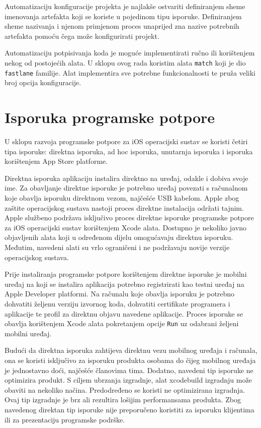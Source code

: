 \documentclass[times, utf8, diplomski, numeric]{fer}
\begin{document}
Automatizaciju konfiguracije projekta je najlakše ostvariti definiranjem sheme imenovanja artefakta koji se koriste u pojedinom tipu isporuke. Definiranjem sheme nazivanja i njenom primjenom proces unaprijed zna nazive potrebnih artefakta pomoću čega može konfigurirati projekt.

Automatizaciju potpisivanja koda je moguće implementirati ručno ili korištenjem nekog od postojećih alata. U sklopu ovog rada koristim alata \verb|match| koji je dio \verb|fastlane| familije. Alat implementira sve potrebne funkcionalnosti te pruža veliki broj opcija konfiguracije.

\section{Isporuka programske potpore} \label{header:RucnaIsporuka}

U sklopu razvoja programske potpore za iOS operacijski sustav se koristi četiri tipa isporuke: direktna isporuka, ad hoc isporuka, unutarnja isporuka i isporuka korištenjem App Store platforme.

Direktna isporuka aplikaciju instalira direktno na uređaj, odakle i dobiva svoje ime. Za obavljanje direktne isporuke je potrebno uređaj povezati s računalnom koje obavlja isporuku direktnom vezom, najčešće USB kabelom. Apple zbog zaštite operacijskog sustava nastoji proces direktne instalacija održati tajnim. Apple službeno podržava isključivo proces direktne isporuke programske potpore za iOS operacijski sustav korištenjem Xcode alata. Dostupno je nekoliko javno objavljenih alata koji u određenom dijelu omogućavaju direktnu isporuku. Međutim, navedeni alati su vrlo ograničeni i ne podržavaju novije verzije operacijskog sustava.

Prije instaliranja programske potpore korištenjem direktne isporuke je mobilni uređaj na koji se instalira aplikacija potrebno registrirati kao testni uređaj na Apple Developer platformi. Na računalu koje obavlja isporuku je potrebno dohvatiti željenu verziju izvornog koda, dohvatiti certifikate programera i aplikacije te profil za direktnu objavu navedene aplikacije. Proces isporuke se obavlja korištenjem Xcode alata pokretanjem opcije \verb|Run| uz odabrani željeni mobilni uređaj.

Budući da direktna isporuka zahtijeva direktnu vezu mobilnog uređaja i računala, ona se koristi isključivo za isporuku produkta osobama do čijeg mobilnog uređaja je jednostavno doći, najčešće članovima tima. Dodatno, navedeni tip isporuke ne optimizira produkt. S ciljem ubrzanja izgradnje, alat xcodebuild izgradnju može obaviti na nekoliko načina. Predodređeno se koristi ne optimizirana izgradnja. Ovaj tip izgradnje je brz ali rezultira lošijim performansama produkta. Zbog navedenog direktan tip isporuke nije preporučeno koristiti za isporuku klijentima ili za prezentaciju programske podrške.
\end{document}

